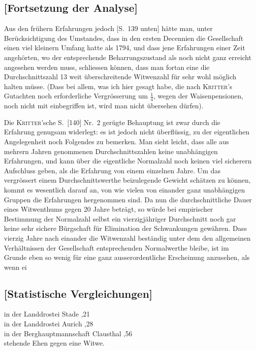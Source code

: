 \documentclass[12pt,a4paper]{article}
\begin{document}
\subsection*{[Fortsetzung der Analyse]}

Aus den frühern Erfahrungen jedoch [S.~139 unten] hätte man, unter Berücksichtigung des Umstandes, dass in den ersten Decennien die Gesellschaft einen viel kleinern Umfang hatte als 1794, und dass jene Erfahrungen einer Zeit angehörten, wo der entsprechende Beharrungszustand als noch nicht ganz erreicht angesehen werden muss, schliessen können, dass man fortan eine die Durchschnittszahl 13 weit überschreitende Witwenzahl für sehr wohl möglich halten müsse. (Dass bei allem, was ich hier gesagt habe, die nach \textsc{Kritter}'s Gutachten noch erforderliche Vergrösserung um $\frac{1}{4}$, wegen der Waisenpensionen, noch nicht mit einbegriffen ist, wird man nicht übersehen dürfen).

Die \textsc{Kritter}'sche S.~[140] Nr.~2 gerügte Behauptung ist zwar durch die Erfahrung genugsam widerlegt: es ist jedoch nicht überflüssig, zu der eigentlichen Angelegenheit noch Folgendes zu bemerken. Man sieht leicht, dass alle aus mehrern Jahren genommenen Durchschnittszahlen keine unabhängigen Erfahrungen, und kann über die eigentliche Normalzahl noch keinen viel sicherern Aufschluss geben, als die Erfahrung von einem einzelnen Jahre. Um das vergrössert einem Durchschnittswerthe beizulegende Gewicht schätzen zu können, kommt es wesentlich darauf an, von wie vielen von einander ganz unabhängigen Gruppen die Erfahrungen hergenommen sind. Da nun die durchschnittliche Dauer eines Witwenthums gegen 20 Jahre beträgt, so würde bei empirischer Bestimmung der Normalzahl selbst ein vierzigjähriger Durchschnitt noch gar keine sehr sichere Bürgschaft für Elimination der Schwankungen gewähren. Dass vierzig Jahre nach einander die Witwenzahl beständig unter dem den allgemeinen Verhältnissen der Gesellschaft entsprechenden Normalwerthe bleibe, ist im Grunde eben so wenig für eine ganz ausserordentliche Erscheinung anzusehen, als wenn ei

\subsection*{[Statistische Vergleichungen]}

in der Landdrostei Stade ,21\\
in der Landdrostei Aurich ,28\\
in der Berghauptmannschaft Clausthal ,56\\
stehende Ehen gegen eine Witwe.
\end{document}
